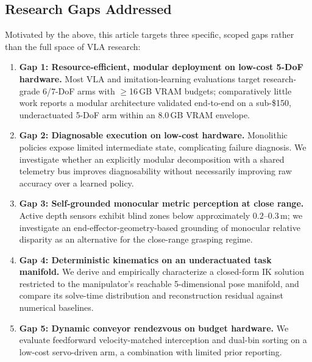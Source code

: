 \documentclass[journal]{IEEEtran}
\begin{document}
\subsection{Research Gaps Addressed}
Motivated by the above, this article targets three specific, scoped gaps rather than the full space of VLA research:
\begin{enumerate}
    \item \textbf{Gap 1: Resource-efficient, modular deployment on low-cost 5-DoF hardware.} Most VLA and imitation-learning evaluations target research-grade 6/7-DoF arms with $\ge$16\,GB VRAM budgets; comparatively little work reports a modular architecture validated end-to-end on a sub-\$150, underactuated 5-DoF arm within an 8.0\,GB VRAM envelope.
    \item \textbf{Gap 2: Diagnosable execution on low-cost hardware.} Monolithic policies expose limited intermediate state, complicating failure diagnosis. We investigate whether an explicitly modular decomposition with a shared telemetry bus improves diagnosability without necessarily improving raw accuracy over a learned policy.
    \item \textbf{Gap 3: Self-grounded monocular metric perception at close range.} Active depth sensors exhibit blind zones below approximately $0.2$--$0.3$\,m; we investigate an end-effector-geometry-based grounding of monocular relative disparity as an alternative for the close-range grasping regime.
    \item \textbf{Gap 4: Deterministic kinematics on an underactuated task manifold.} We derive and empirically characterize a closed-form IK solution restricted to the manipulator's reachable 5-dimensional pose manifold, and compare its solve-time distribution and reconstruction residual against numerical baselines.
    \item \textbf{Gap 5: Dynamic conveyor rendezvous on budget hardware.} We evaluate feedforward velocity-matched interception and dual-bin sorting on a low-cost servo-driven arm, a combination with limited prior reporting.
\end{enumerate}
\end{document}
